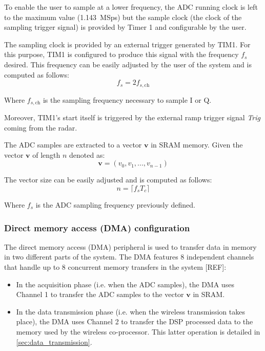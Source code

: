 To enable the user to sample at a lower frequency, the ADC running clock is left to the maximum value (\SI{1.143}{MSps}) but the sample clock (the clock of the sampling trigger signal) is provided by Timer 1 and configurable by the user.

The sampling clock is provided by an external trigger generated by TIM1. For this purpose, TIM1 is configured to produce this signal with the frequency $f_{s}$ desired. This frequency can be easily adjusted by the user of the system and is computed as follows:
\begin{equation}
	f_s = 2 f_{s,\mathrm{ch}}
\end{equation}

Where $f_{s,\mathrm{ch}}$ is the sampling frequency necessary to sample I or Q.

Moreover, TIM1's start itself is triggered by the external ramp trigger signal \textit{Trig} coming from the radar.

The ADC samples are extracted to a vector $\mathbf{v}$ in SRAM memory. Given the vector $\mathbf{v}$ of length $n$ denoted as:
\begin{equation}
 \mathbf{v} = (v_0, v_1, ..., v_{n-1})
\end{equation}

The vector size can be easily adjusted and is computed as follows:
\begin{equation}
	n = \lceil f_s T_c \rceil
\end{equation}

Where $f_s$ is the ADC sampling frequency previously defined.

\subsubsection{Direct memory access (DMA) configuration} \label{sec:dma}

The direct memory access (DMA) peripheral is used to transfer data in memory in two different parts of the system. The DMA features 8 independent channels that handle up to 8 concurrent memory transfers in the system [REF]:
\begin{itemize}
	\item In the acquisition phase (i.e. when the ADC samples), the DMA uses Channel 1 to transfer the ADC samples to the vector $\mathbf{v}$ in SRAM.
	\item In the data transmission phase (i.e. when the wireless transmission takes place), the DMA uses Channel 2 to transfer the DSP processed data to the memory used by the wireless co-processor. This latter operation is detailed in \cref{sec:data_transmission}.
\end{itemize}

